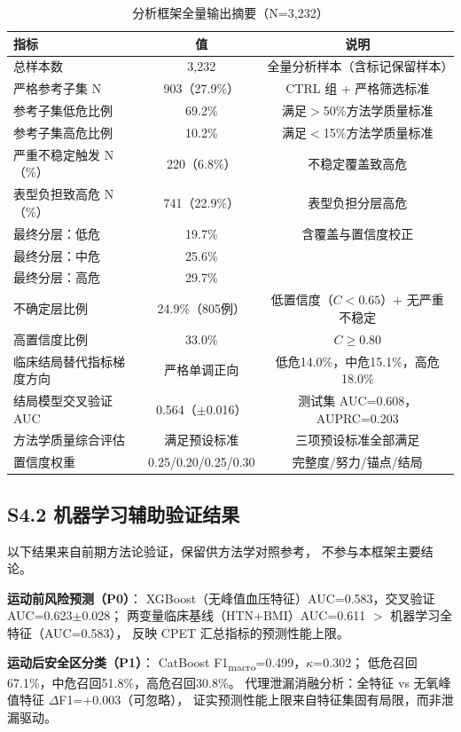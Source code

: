 \documentclass[12pt, a4paper]{ctexart}
\begin{document}
\begin{table}[htbp]
\centering
\small
\caption{分析框架全量输出摘要（N=3,232）}
\label{tab:s7_output_summary}
\begin{tabular}{lcc}
\toprule
指标 & 值 & 说明 \\
\midrule
总样本数 & 3,232 & 全量分析样本（含标记保留样本） \\
严格参考子集 N & 903（27.9\%）& CTRL 组 + 严格筛选标准 \\
参考子集低危比例 & 69.2\% & 满足$>$50\%方法学质量标准 \\
参考子集高危比例 & 10.2\% & 满足$<$15\%方法学质量标准 \\
严重不稳定触发 N（\%）& 220（6.8\%）& 不稳定覆盖致高危 \\
表型负担致高危 N（\%）& 741（22.9\%）& 表型负担分层高危 \\
最终分层：低危 & 19.7\% & 含覆盖与置信度校正 \\
最终分层：中危 & 25.6\% & \\
最终分层：高危 & 29.7\% & \\
不确定层比例 & 24.9\%（805例）& 低置信度（$C<0.65$）+ 无严重不稳定 \\
高置信度比例 & 33.0\% & $C\geq$0.80 \\
临床结局替代指标梯度方向 & 严格单调正向 & 低危14.0\%，中危15.1\%，高危18.0\% \\
结局模型交叉验证 AUC & 0.564（$\pm$0.016）& 测试集 AUC=0.608，AUPRC=0.203 \\
方法学质量综合评估 & 满足预设标准 & 三项预设标准全部满足 \\
置信度权重 & 0.25/0.20/0.25/0.30 & 完整度/努力/锚点/结局 \\
\bottomrule
\end{tabular}
\end{table}

\subsection*{S4.2 机器学习辅助验证结果}

以下结果来自前期方法论验证，保留供方法学对照参考，
不参与本框架主要结论。

\textbf{运动前风险预测（P0）}：
XGBoost（无峰值血压特征）AUC=0.583，交叉验证 AUC=0.623$\pm$0.028；
两变量临床基线（HTN+BMI）AUC=0.611 $>$ 机器学习全特征（AUC=0.583），
反映 CPET 汇总指标的预测性能上限。

\textbf{运动后安全区分类（P1）}：
CatBoost F1\textsubscript{macro}=0.499，$\kappa$=0.302；
低危召回67.1\%，中危召回51.8\%，高危召回30.8\%。
代理泄漏消融分析：全特征 vs 无氧峰值特征 $\Delta$F1=+0.003（可忽略），
证实预测性能上限来自特征集固有局限，而非泄漏驱动。
\end{document}
